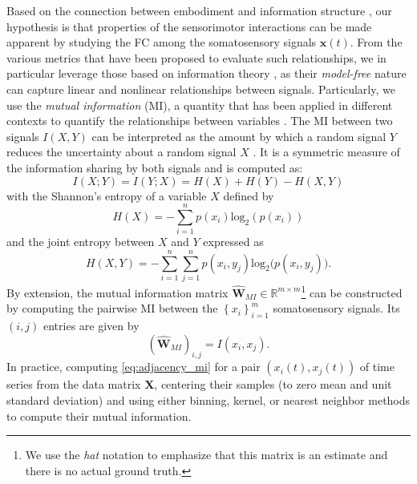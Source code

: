 Based on the connection between embodiment and information structure \cite{Pfeifer2007Selforganizationembodiment}, our hypothesis is that properties of the sensorimotor interactions can be made apparent by studying the FC among the somatosensory signals $ \bm{x}(t) $. From the various metrics that have been proposed to evaluate such relationships, we in particular leverage those based on information theory \cite{Bonsignorio2020EntropyBasedMetrics,Bonsignorio2013Quantifyingevolutionaryself}, as their \emph{model-free} nature can capture linear and nonlinear relationships between signals. Particularly, we use the \emph{mutual information} (MI), a quantity that has been applied in different contexts to quantify the relationships between variables \cite{Steuer2002mutualinformationdetecting}. The MI between two signals $ I\left(X,Y\right) $ can be interpreted as the amount by which a random signal $ Y $ reduces the uncertainty about a random signal $ X $ \cite{Cover1999Elementsinformationtheory}. It is a symmetric measure of the information sharing by both signals and is computed as:
\begin{equation}\label{eq:mutual_information}
	I\left(X;Y\right) =I\left(Y;X\right) = H(X) + H(Y) - H(X,Y)
\end{equation}
with the Shannon's entropy of a variable $X$ defined by 
\begin{equation}\label{eq:entropy}
	H(X) = -\sum_{i=1}^{n}p(x_i)\text{log}_2\left(p\left(x_i\right)\right)
\end{equation}
and the joint entropy between $ X $ and $ Y $ expressed as
\begin{equation}\label{eq:joint_entropy}
	H(X,Y) = -\sum_{i=1}^{n}\sum_{j=1}^{n} p(x_i,y_j)\text{log}_2\big(p\left(x_i,y_j\right)\big).
\end{equation}
By extension, the mutual information matrix $ \hat{\bm{W}}_{MI} \in \mathbb{R}^{m \times m}$\footnote{We use the \emph{hat} notation to emphasize that this matrix is an estimate and there is no actual ground truth.} can be constructed by computing the pairwise MI between the $\left\lbrace x_i\right\rbrace^m_{i=1}$ somatosensory signals. Its $(i,j)$ entries are given by
\begin{equation}\label{eq:adjacency_mi}
	(\hat{\bm{W}}_{MI})_{i,j} = I(x_i,x_j).
\end{equation}
In practice, computing \eqref{eq:adjacency_mi}  for a pair $\left({x}_i(t),{x}_j(t)\right)$ of time series from the data matrix $\bm{X}$, centering their samples (to zero mean and unit standard deviation) and using either binning, kernel, or nearest neighbor methods \cite{WaltersWilliams2009Estimationmutualinformation} to compute their mutual information. 

